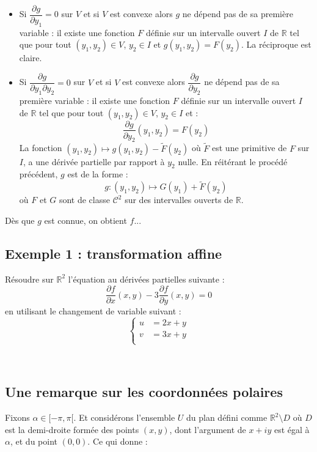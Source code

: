 \documentclass[french,11pt,twoside]{VcCours}
\begin{document}
\begin{itemize}
\item Si $\dfrac{\partial g}{\partial y_1} =0$ sur $V$ et si $V$ est convexe alors $g$ ne dépend pas de sa première variable : il existe une fonction $F$ définie sur un intervalle ouvert $I$ de $\mathbb{R}$ tel que pour tout $(y_1,y_2) \in V$, $y_2 \in I$ et $g(y_1,y_2)=F(y_2)$. La réciproque est claire.
\item Si $\dfrac{\partial g}{\partial y_1 \partial y_2} =0$ sur $V$ et si $V$ est convexe alors $\dfrac{\partial g}{\partial y_2}$ ne dépend pas de sa première variable : il existe une fonction $F$ définie sur un intervalle ouvert $I$ de $\mathbb{R}$ tel que pour tout $(y_1,y_2) \in V$, $y_2 \in I$ et :
$$  \dfrac{\partial g}{\partial y_2}(y_1,y_2)=F(y_2)$$
La fonction $(y_1,y_2) \mapsto g(y_1,y_2) - \tilde{F}(y_2)$ où $\tilde{F}$ est une primitive de $F$ sur $I$, a une dérivée partielle par rapport à $y_2$ nulle. En réitérant le procédé précédent, $g$ est de la forme :
$$ g : (y_1,y_2) \mapsto G(y_1)+\tilde{F}(y_2)$$
où $F$ et $G$ sont de classe $\mathcal{C}^2$ sur des intervalles ouverts de $\mathbb{R}$.
\end{itemize}

\medskip

Dès que $g$ est connue, on obtient $f$...
\subsection{Exemple 1 : transformation affine}
Résoudre sur $\mathbb{R}^2$ l'équation au dérivées partielles suivante :
$$ \dfrac{\partial f}{\partial x}(x,y) - 3 \dfrac{\partial f}{\partial y}(x,y) = 0$$
en utilisant le changement de variable suivant :
$$ \left\lbrace \begin{array}{ccl}
u & = 2x+y \\
v& = 3x+y \\
\end{array}\right.$$

\newpage

$\phantom{}$
\vspace*{3cm}


\subsection{Une remarque sur les coordonnées polaires}
Fixons $\alpha \in [-\pi,\pi[$. Et considérons l'ensemble $U$ du plan défini comme $\mathbb{R}^2 \setminus D$ où $D$ est la demi-droite formée des points $(x,y)$, dont l'argument de $x+iy$ est égal à $\alpha$, et du point $(0,0)$. Ce qui donne :
\end{document}

